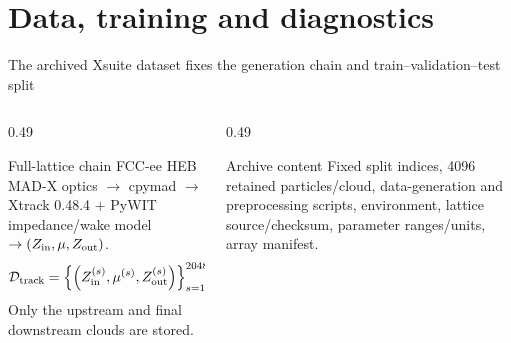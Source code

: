 \section{Data, training and diagnostics}
\begin{frame}[t,shrink=5]{The archived Xsuite dataset fixes the generation chain and train–validation–test split}
\begin{columns}[T,onlytextwidth]
\begin{column}{0.49\textwidth}
\begin{block}{Full-lattice chain}
FCC-ee HEB MAD-X optics $\to$ cpymad $\to$ Xtrack 0.48.4 \ensuremath{+} PyWIT impedance/wake model $\to (Z_{\rm in},\mu,Z_{\rm out})$.
\[\mathcal D_{\rm track}=\left\{\left(Z_{\rm in}^{(s)},\mu^{(s)},Z_{\rm out}^{(s)}\right)\right\}_{s=1}^{2048}.\]
Only the upstream and final downstream clouds are stored.
\end{block}

\end{column}
\begin{column}{0.49\textwidth}
\begin{block}{Archive content}
Fixed split indices, 4096 retained particles/cloud, data-generation and preprocessing scripts, environment, lattice source/checksum, parameter ranges/units, array manifest.
\end{block}

\end{column}
\end{columns}


\end{frame}

